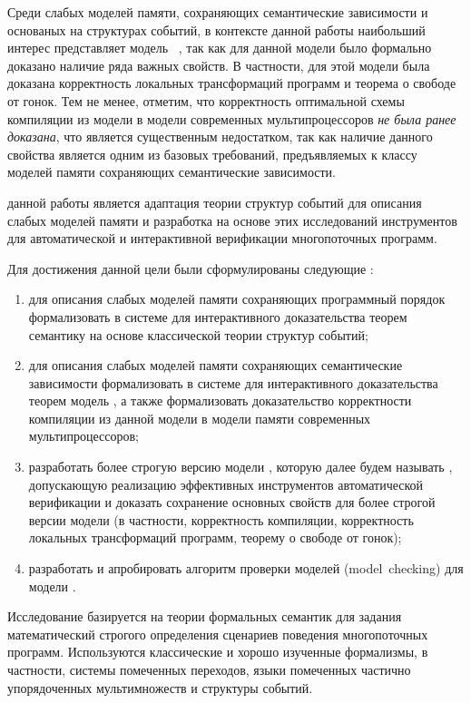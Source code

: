 Среди слабых моделей памяти, сохраняющих семантические зависимости
и основаных на структурах событий, в контексте данной работы наибольший интерес
представляет модель \Wkm~\autocite{Chakraborty-Vafeiadis:POPL19},
так как для данной модели было формально доказано наличие ряда важных свойств.
В частности, для этой модели была доказана корректность
локальных трансформаций программ и теорема о свободе от гонок.
Тем не менее, отметим, что корректность оптимальной схемы
компиляции из модели \Wkm в модели современных мультипроцессоров
\emph{не была ранее доказана}, что является существенным недостатком,
так как наличие данного свойства является одним из базовых требований,
предъявляемых к классу моделей памяти сохраняющих семантические зависимости.

{\aim} данной работы является адаптация теории структур событий
для описания слабых моделей памяти и разработка на основе этих исследований 
инструментов для автоматической и интерактивной верификации многопоточных программ. 

Для достижения данной цели были сформулированы следующие {\tasks}:
\begin{enumerate}[beginpenalty=10000] %
  \item для описания слабых моделей памяти сохраняющих программный порядок
    формализовать в системе для интерактивного доказательства теорем \coq
    семантику на основе классической теории структур событий; 
  \item для описания слабых моделей памяти сохраняющих семантические зависимости
    формализовать в системе для интерактивного доказательства теорем \coq
    модель \Wkm, а также формализовать доказательство корректности компиляции
    из данной модели в модели памяти современных мультипроцессоров;
  \item разработать более строгую версию модели \Wkm, которую далее будем называть \WkmS, 
    допускающую реализацию эффективных инструментов автоматической верификации
    и доказать сохранение основных свойств \Wkm для более строгой версии модели 
    (в частности, корректность компиляции, корректность локальных трансформаций программ, 
     теорему о свободе от гонок);
  \item разработать и апробировать алгоритм проверки моделей (model~checking) для модели \WkmS.
\end{enumerate}

{\methods}

Исследование базируется на теории формальных семантик для 
задания математический строгого определения сценариев поведения многопоточных программ. 
Используются классические и хорошо изученные формализмы, в частности, 
системы помеченных переходов, языки помеченных частично упорядоченных мультимножеств и структуры событий. 

